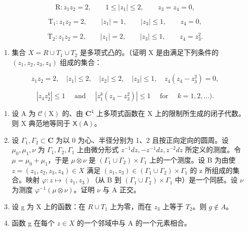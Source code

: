 \[
\mathrm{R} \colon z _ {1} z _ {2} = 2, \qquad 1 \leqslant | z _ {1} | \leqslant 2, \qquad z _ {3} = z _ {4} = 0,
\]

\[
\mathrm{T} _ {1} \colon z _ {1} z _ {2} = 2, \qquad | z _ {1} | = 1, \qquad | z _ {3} | \leqslant 1, \qquad z _ {4} = 0,
\]

\[
\mathrm{T} _ {2} \colon z _ {1} z _ {2} = 2, \qquad | z _ {1} | = 2, \qquad | z _ {3} | \leqslant 1, \qquad z _ {4} = z _ {3} ^ {2}.
\]

\begin{enumerate}
\def\labelenumi{\alph{enumi})}
\tightlist
\item
  集合 \(X = R \cup T_{1} \cup T_{2}\) 是多项式凸的。（证明 X 是由满足下列条件的 \((z_{1}, z_{2}, z_{3}, z_{4})\) 组成的集合：
\end{enumerate}

\[
z _ {1} z _ {2} = 2, \quad | z _ {1} | \leqslant 2, \quad | z _ {2} | \leqslant 2, \quad | z _ {3} | \leqslant 1, \quad z _ {4} (z _ {4} - z _ {3} ^ {2}) = 0,
\]

\[
| z _ {4} z _ {2} ^ {k} | \leqslant 1 \quad \text { and } \quad | z _ {1} ^ {k} (z _ {4} - z _ {3} ^ {2}) | \leqslant 1 \quad \text { for } \quad k = 1, 2, \ldots).
\]

\begin{enumerate}
\def\labelenumi{\alph{enumi})}
\setcounter{enumi}{1}
\item
  设 A 为 \(\mathcal{C}(\mathrm{X})\) 的、由 \(\mathbf{C}^4\) 上多项式函数在 X 上的限制所生成的闭子代数。则 X 典范地等同于 \(\mathsf{X}(\mathsf{A})\)。
\item
  设 \(\Gamma_1, \Gamma_2 \subset \mathbf{C}\) 为以 0 为心、半径分别为 1、2 且按正向定向的圆周。设 \(\mu_0, \mu_1, \nu\) 为 \(\Gamma_1, \Gamma_2, \Gamma_1\) 上由微分形式 \(z^{-1} dz, -z^{-1} dz, z^{-2} dz\) 所定义的测度。令 \(\mu = \mu_0 + \mu_1\)，于是 \(\mu \otimes \nu\) 是 \((\Gamma_1 \cup \Gamma_2) \times \Gamma_1\) 上的一个测度。设 B 为由使 \(z = (z_1, z_2, z_3, z_4) \in X\) 满足 \((z_1, z_3) \in (\Gamma_1 \cup \Gamma_2) \times \Gamma_1\) 的 z 所组成的集合。映射 \(\varphi: z \mapsto (z_1, z_3)\)（从 B 到 \((\Gamma_{1} \cup \Gamma_{2}) \times \Gamma_{1}\) 中）是一个同胚。设 \(\nu\) 为测度 \(\varphi^{-1}(\mu \otimes \nu)\)。证明 \(\nu\) 与 A 正交。
\item
  设 g 为 X 上的函数：在 \(R \cup T_{1}\) 上为零，而在 \(z_{3}\) 上等于 \(T_{2}\)。则 \(g \notin A\)。
\item
  函数 g 在每个 \(z \in X\) 的一个邻域中与 A 的一个元素相合。
\end{enumerate}

